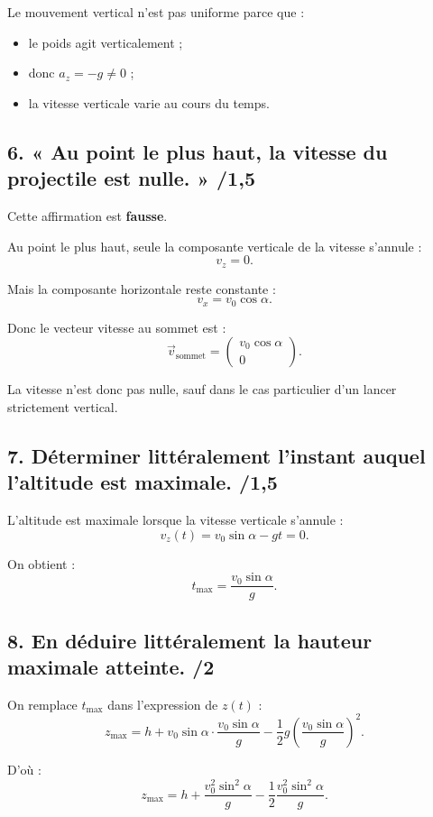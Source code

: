 \documentclass[11pt,a4paper]{article}
\begin{document}
Le mouvement vertical n'est pas uniforme parce que :
\begin{itemize}
    \item le poids agit verticalement ;
    \item donc \(a_z=-g\neq 0\) ;
    \item la vitesse verticale varie au cours du temps.
\end{itemize}

\subsection*{6. « Au point le plus haut, la vitesse du projectile est nulle. » \hfill /1{,}5}

Cette affirmation est \textbf{fausse}.

Au point le plus haut, seule la composante verticale de la vitesse s'annule :
\[
v_z=0.
\]

Mais la composante horizontale reste constante :
\[
v_x=v_0\cos\alpha.
\]

Donc le vecteur vitesse au sommet est :
\[
\vec v_{\text{sommet}}=
\begin{pmatrix}
v_0\cos\alpha\\
0
\end{pmatrix}.
\]

La vitesse n'est donc pas nulle, sauf dans le cas particulier d'un lancer strictement vertical.

\subsection*{7. Déterminer littéralement l'instant auquel l'altitude est maximale. \hfill /1{,}5}

L'altitude est maximale lorsque la vitesse verticale s'annule :
\[
v_z(t)=v_0\sin\alpha - gt = 0.
\]

On obtient :
\[
\boxed{t_{\max}=\frac{v_0\sin\alpha}{g}.}
\]

\subsection*{8. En déduire littéralement la hauteur maximale atteinte. \hfill /2}

On remplace \(t_{\max}\) dans l'expression de \(z(t)\) :
\[
z_{\max}=h+v_0\sin\alpha \cdot \frac{v_0\sin\alpha}{g}
-\frac12 g\left(\frac{v_0\sin\alpha}{g}\right)^2.
\]

D'où :
\[
z_{\max}=h+\frac{v_0^2\sin^2\alpha}{g}
-\frac12\frac{v_0^2\sin^2\alpha}{g}.
\]
\end{document}
